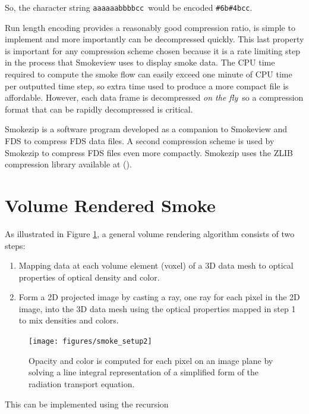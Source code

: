 So, the character string {\tt aaaaaabbbbcc}\ would be encoded {\tt \#6b\#4bcc}.

Run length encoding provides a reasonably good compression ratio, is simple to implement and more importantly can be decompressed quickly. This last property is important for any compression
scheme chosen because it is a rate limiting step in the process that Smokeview uses to display smoke data. The CPU time required to compute the smoke flow can easily exceed one minute of CPU time
per outputted time step, so extra time used to produce a more compact file is affordable. However, each data frame is decompressed {\em on the fly}\ so a compression format that can be
rapidly decompressed is critical.

Smokezip is a software program developed as a companion to Smokeview and FDS to compress FDS data files. A second compression scheme is used by Smokezip to compress FDS files even more
compactly.  Smokezip uses the ZLIB compression library available at ().

%
%

\section{Volume Rendered Smoke}
As illustrated in Figure \ref{figsmokesetup2}, a general volume rendering algorithm consists of two steps:

\begin{enumerate}
\item Mapping data at each volume element (voxel) of a 3D data
mesh to optical properties of optical density and color. \item
Form a 2D projected image by casting a ray, one ray for each pixel
in the 2D image, into the 3D data mesh using the optical
properties mapped in step 1 to mix densities and colors.
\end{enumerate}

\begin{figure}[\figoptions]
\begin{center}
\texttt{[image: figures/smoke\_setup2]}
\end{center}
\caption {Opacity and color is computed for each pixel on an image plane by solving a line integral
representation of a simplified form of the radiation transport equation.
}
\label{figsmokesetup2}
\end{figure}

This can be implemented \cite[Chapter 39]{gpugems} using the recursion

